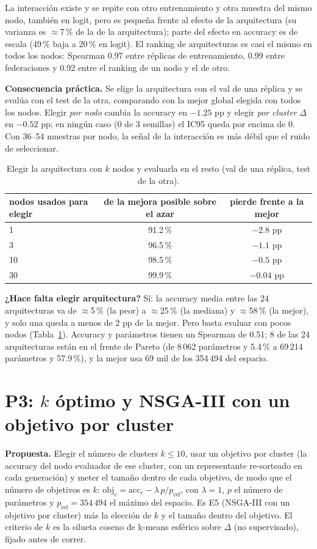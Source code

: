 \documentclass[11pt,a4paper]{article}
\newcommand{\acc}{\mathrm{acc}}
\begin{document}
La interacción existe y se repite con otro entrenamiento y otra muestra del mismo nodo, también en logit, pero es pequeña frente al efecto de la arquitectura (su varianza es $\approx$7\,\% de la de la arquitectura); parte del efecto en accuracy es de escala (49\,\% baja a 20\,\% en logit). El ranking de arquitecturas es casi el mismo en todos los nodos: Spearman 0.97 entre réplicas de entrenamiento, 0.99 entre federaciones y 0.92 entre el ranking de un nodo y el de otro.

\textbf{Consecuencia práctica.} Se elige la arquitectura con el val de una réplica y se evalúa con el test de la otra, comparando con la mejor global elegida con todos los nodos. Elegir \emph{por nodo} cambia la accuracy en $-1.25$ pp y elegir \emph{por cluster} $\Delta$ en $-0.52$ pp; en ningún caso (0 de 3 semillas) el IC95 queda por encima de 0. Con 36--54 muestras por nodo, la señal de la interacción es más débil que el ruido de seleccionar.

\begin{table}[h]
\centering\small
\begin{tabular}{lcc}
\toprule
nodos usados para elegir & de la mejora posible sobre el azar & pierde frente a la mejor\\
\midrule
1 & 91.2\,\% & $-2.8$ pp\\
3 & 96.5\,\% & $-1.1$ pp\\
10 & 98.5\,\% & $-0.5$ pp\\
30 & 99.9\,\% & $-0.04$ pp\\
\bottomrule
\end{tabular}
\caption{Elegir la arquitectura con $k$ nodos y evaluarla en el resto (val de una réplica, test de la otra).}
\label{tab:pick}
\end{table}

\textbf{¿Hace falta elegir arquitectura?} Sí: la accuracy media entre las 24 arquitecturas va de $\approx$5\,\% (la peor) a $\approx$25\,\% (la mediana) y $\approx$58\,\% (la mejor), y solo una queda a menos de 2 pp de la mejor. Pero basta evaluar con pocos nodos (Tabla~\ref{tab:pick}). Accuracy y parámetros tienen un Spearman de 0.51; 8 de las 24 arquitecturas están en el frente de Pareto (de 8\,062 parámetros y 5.4\,\% a 69\,214 parámetros y 57.9\,\%), y la mejor usa 69 mil de los 354\,494 del espacio.

\section{P3: $k$ óptimo y NSGA-III con un objetivo por cluster}
\label{sec:p3}
\textbf{Propuesta.} Elegir el número de clusters $k\le10$, usar un objetivo por cluster (la accuracy del nodo evaluador de ese cluster, con un representante re-sorteado en cada generación) y meter el tamaño dentro de cada objetivo, de modo que el número de objetivos es $k$: $\mathrm{obj}_c=\acc_c-\lambda\,p/p_{\mathrm{ref}}$, con $\lambda=1$, $p$ el número de parámetros y $p_{\mathrm{ref}}=354\,494$ el máximo del espacio. Es E5 (NSGA-III con un objetivo por cluster) más la elección de $k$ y el tamaño dentro del objetivo. El criterio de $k$ es la silueta coseno de k-means esférico sobre $\Delta$ (no supervisado), fijado antes de correr.
\end{document}
